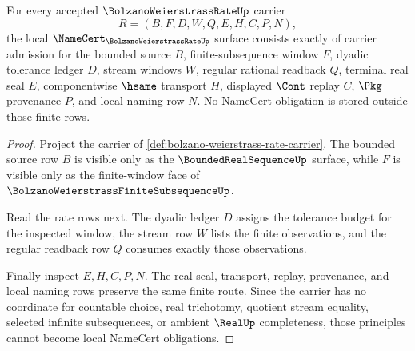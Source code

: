 \begin{theorem}
\label{thm:bolzano-weierstrass-rate-namecert-obligations}
For every accepted $\BolzanoWeierstrassRateUp$ carrier
$$
R=(B,F,D,W,Q,E,H,C,P,N),
$$
the local $\NameCert_{\BolzanoWeierstrassRateUp}$ surface consists exactly of carrier admission for the bounded source $B$, finite-subsequence window $F$, dyadic tolerance ledger $D$, stream windows $W$, regular rational readback $Q$, terminal real seal $E$, componentwise $\hsame$ transport $H$, displayed $\Cont$ replay $C$, $\Pkg$ provenance $P$, and local naming row $N$. No NameCert obligation is stored outside those finite rows.
\end{theorem}
\begin{proof}
Project the carrier of \autoref{def:bolzano-weierstrass-rate-carrier}. The bounded source row $B$ is visible only as the $\BoundedRealSequenceUp$ surface, while $F$ is visible only as the finite-window face of $\BolzanoWeierstrassFiniteSubsequenceUp$.

Read the rate rows next. The dyadic ledger $D$ assigns the tolerance budget for the inspected window, the stream row $W$ lists the finite observations, and the regular readback row $Q$ consumes exactly those observations.

Finally inspect $E,H,C,P,N$. The real seal, transport, replay, provenance, and local naming rows preserve the same finite route. Since the carrier has no coordinate for countable choice, real trichotomy, quotient stream equality, selected infinite subsequences, or ambient $\RealUp$ completeness, those principles cannot become local NameCert obligations.
\end{proof}

